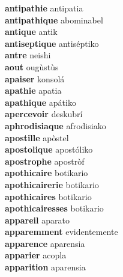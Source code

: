 \textbf{antipathie } antipatia \\
\textbf{antipathique } abominabel \\
\textbf{antique } antik \\
\textbf{antiseptique } antiséptiko \\
\textbf{antre } neishi \\
\textbf{aout } ougùstùs \\
\textbf{apaiser } konsolá \\
\textbf{apathie } apatia \\
\textbf{apathique } apátiko \\
\textbf{apercevoir } deskubrí \\
\textbf{aphrodisiaque } afrodisiako \\
\textbf{apostille } apòstel \\
\textbf{apostolique } apostóliko \\
\textbf{apostrophe } apostròf \\
\textbf{apothicaire } botikario \\
\textbf{apothicairerie } botikario \\
\textbf{apothicaires } botikario \\
\textbf{apothicairesses } botikario \\
\textbf{appareil } aparato \\
\textbf{apparemment } evidentemente \\
\textbf{apparence } aparensia \\
\textbf{apparier } acopla \\
\textbf{apparition } aparensia \\
